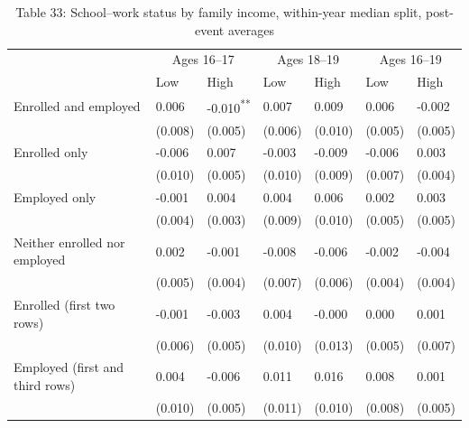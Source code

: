 \documentclass[12pt]{article}
\begin{document}
\begin{table}
\centering
\caption{Table 33: School--work status by family income, within-year median split, post-event averages}

\small
\begin{tabular}{p{}p{}p{}p{}p{}p{}p{}}
\toprule
 & \multicolumn{2}{c}{Ages 16--17} & \multicolumn{2}{c}{Ages 18--19} & \multicolumn{2}{c}{Ages 16--19} \\

 & Low & High & Low & High & Low & High \\
\midrule
Enrolled and employed & 0.006 & -0.010\textsuperscript{**} & 0.007 & 0.009 & 0.006 & -0.002 \\
 & (0.008) & (0.005) & (0.006) & (0.010) & (0.005) & (0.005) \\
Enrolled only & -0.006 & 0.007 & -0.003 & -0.009 & -0.006 & 0.003 \\
 & (0.010) & (0.005) & (0.010) & (0.009) & (0.007) & (0.004) \\
Employed only & -0.001 & 0.004 & 0.004 & 0.006 & 0.002 & 0.003 \\
 & (0.004) & (0.003) & (0.009) & (0.010) & (0.005) & (0.005) \\
Neither enrolled nor employed & 0.002 & -0.001 & -0.008 & -0.006 & -0.002 & -0.004 \\
 & (0.005) & (0.004) & (0.007) & (0.006) & (0.004) & (0.004) \\
Enrolled (first two rows) & -0.001 & -0.003 & 0.004 & -0.000 & 0.000 & 0.001 \\
 & (0.006) & (0.005) & (0.010) & (0.013) & (0.005) & (0.007) \\
Employed (first and third rows) & 0.004 & -0.006 & 0.011 & 0.016 & 0.008 & 0.001 \\
 & (0.010) & (0.005) & (0.011) & (0.010) & (0.008) & (0.005) \\
\bottomrule
\end{tabular}

\end{table}
\end{document}
